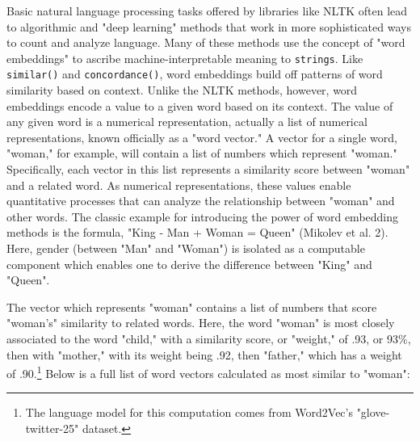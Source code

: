 \documentclass[11pt]{article}
\begin{document}
Basic natural language processing tasks offered by libraries like NLTK
often lead to algorithmic and "deep learning" methods that work in
more sophisticated ways to count and analyze language. Many of these
methods use the concept of "word embeddings" to ascribe
machine-interpretable meaning to \texttt{strings}. Like \texttt{similar()} and
\texttt{concordance()}, word embeddings build off patterns of word similarity
based on context. Unlike the NLTK methods, however, word embeddings
encode a value to a given word based on its context. The value of any
given word is a numerical representation, actually a list of numerical
representations, known officially as a "word vector." A vector for a
single word, "woman," for example, will contain a list of numbers
which represent "woman." Specifically, each vector in this list
represents a similarity score between "woman" and a related word. As
numerical representations, these values enable quantitative processes
that can analyze the relationship between "woman" and other words. The
classic example for introducing the power of word embedding methods is
the formula, "King - Man + Woman = Queen" (Mikolev et al. 2). Here,
gender (between "Man" and "Woman") is isolated as a computable
component which enables one to derive the difference between "King"
and "Queen".

The vector which represents "woman" contains a list of numbers that
score "woman's" similarity to related words. Here, the word "woman" is
most closely associated to the word "child," with a similarity score,
or "weight," of .93, or 93\%, then with "mother," with its weight being
.92, then "father," which has a weight of .90.\footnote{The language model for this computation comes from
Word2Vec's "glove-twitter-25" dataset.} Below is a full
list of word vectors calculated as most similar to "woman":

\begin{SOURCE}
\end{SOURCE}
\end{document}
